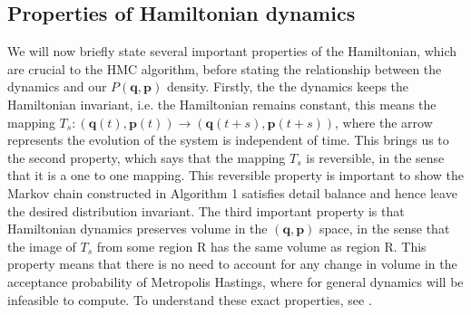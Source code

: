 \documentclass[11pt]{article}
\begin{document}
\subsection{Properties of Hamiltonian dynamics}
We will now briefly state several important properties of the Hamiltonian, which are crucial to the HMC algorithm, before stating the relationship between the dynamics and our $P(\mathbf{q},\mathbf{p})$ density. Firstly, the the dynamics keeps the Hamiltonian invariant, i.e. the Hamiltonian remains constant, this means the mapping $T_s: (\mathbf{q}(t),\mathbf{p}(t)) \rightarrow (\mathbf{q}(t+s),\mathbf{p}(t+s))$, where the arrow represents the evolution of the system is independent of time. This brings us to the second property, which says that the mapping $T_s$ is reversible, in the sense that it is a one to one mapping. This reversible property is important to show the Markov chain constructed in Algorithm 1 satisfies detail balance and hence leave the desired distribution invariant. The third important property is that Hamiltonian dynamics preserves volume in the $(\mathbf{q},\mathbf{p})$ space, in the sense that the image of $T_s$ from some region R has the same volume as region R. This property means that there is no need to account for any change in volume in the acceptance probability of Metropolis Hastings, where for general dynamics will be infeasible to compute. To understand these exact properties, see \cite{neal}.
\end{document}
